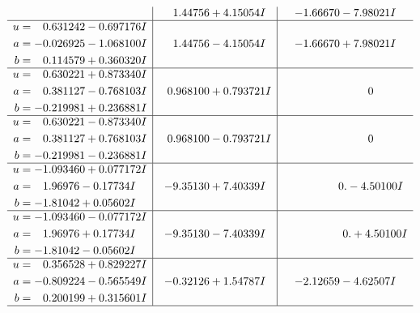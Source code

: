 \documentclass[1p]{elsarticle_modified}
\theoremstyle{definition}
\begin{document}
$$\begin{array}{c|c|c}
 & \phantom{-}1.44756 + 4.15054 I & -1.66670 - 7.98021 I \\ \hline\begin{aligned}
u &= \phantom{-}0.631242 - 0.697176 I \\
a &= -0.026925 - 1.068100 I \\
b &= \phantom{-}0.114579 + 0.360320 I\end{aligned}
 & \phantom{-}1.44756 - 4.15054 I & -1.66670 + 7.98021 I \\ \hline\begin{aligned}
u &= \phantom{-}0.630221 + 0.873340 I \\
a &= \phantom{-}0.381127 - 0.768103 I \\
b &= -0.219981 + 0.236881 I\end{aligned}
 & \phantom{-}0.968100 + 0.793721 I & \phantom{-0.000000 } 0 \\ \hline\begin{aligned}
u &= \phantom{-}0.630221 - 0.873340 I \\
a &= \phantom{-}0.381127 + 0.768103 I \\
b &= -0.219981 - 0.236881 I\end{aligned}
 & \phantom{-}0.968100 - 0.793721 I & \phantom{-0.000000 } 0 \\ \hline\begin{aligned}
u &= -1.093460 + 0.077172 I \\
a &= \phantom{-}1.96976 - 0.17734 I \\
b &= -1.81042 + 0.05602 I\end{aligned}
 & -9.35130 + 7.40339 I & \phantom{-0.000000 } 0. - 4.50100 I \\ \hline\begin{aligned}
u &= -1.093460 - 0.077172 I \\
a &= \phantom{-}1.96976 + 0.17734 I \\
b &= -1.81042 - 0.05602 I\end{aligned}
 & -9.35130 - 7.40339 I & \phantom{-0.000000 -}0. + 4.50100 I \\ \hline\begin{aligned}
u &= \phantom{-}0.356528 + 0.829227 I \\
a &= -0.809224 - 0.565549 I \\
b &= \phantom{-}0.200199 + 0.315601 I\end{aligned}
 & -0.32126 + 1.54787 I & -2.12659 - 4.62507 I\\
 \hline 
 \end{array}$$\newpage$$\begin{array}{c|c|c}  

\end{array}$$
\end{document}
